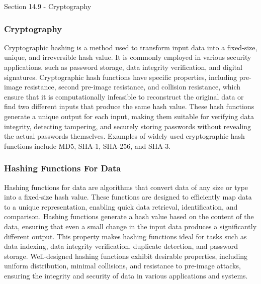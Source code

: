 \begin{notes}{Section 14.9 - Cryptography}
    \subsubsection*{Cryptography}

    Cryptographic hashing is a method used to transform input data into a fixed-size, unique, and irreversible hash value. It is commonly employed in various security applications, such as password storage, data integrity 
    verification, and digital signatures. Cryptographic hash functions have specific properties, including pre-image resistance, second pre-image resistance, and collision resistance, which ensure that it is computationally 
    infeasible to reconstruct the original data or find two different inputs that produce the same hash value. These hash functions generate a unique output for each input, making them suitable for verifying data integrity, 
    detecting tampering, and securely storing passwords without revealing the actual passwords themselves. Examples of widely used cryptographic hash functions include MD5, SHA-1, SHA-256, and SHA-3.
    
    \subsubsection*{Hashing Functions For Data}
    
    Hashing functions for data are algorithms that convert data of any size or type into a fixed-size hash value. These functions are designed to efficiently map data to a unique representation, enabling quick data retrieval, 
    identification, and comparison. Hashing functions generate a hash value based on the content of the data, ensuring that even a small change in the input data produces a significantly different output. This property makes 
    hashing functions ideal for tasks such as data indexing, data integrity verification, duplicate detection, and password storage. Well-designed hashing functions exhibit desirable properties, including uniform distribution, 
    minimal collisions, and resistance to pre-image attacks, ensuring the integrity and security of data in various applications and systems.
\end{notes}